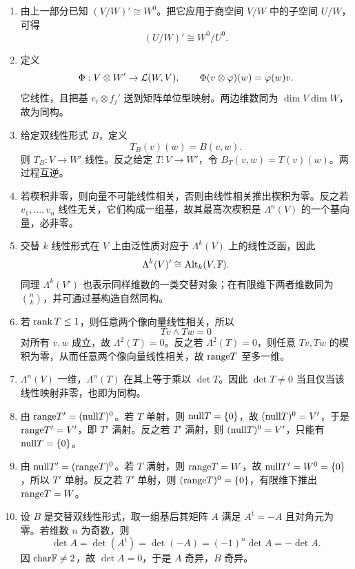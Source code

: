 \begin{enumerate}[resume, label=\textbf{\arabic*.}, leftmargin=*, itemsep=0.5em] \item 由上一部分已知 $(V/W)'\cong W^0$。把它应用于商空间 $V/W$ 中的子空间 $U/W$，可得 \[ (U/W)'\cong W^0/U^0. \] \item 定义 \[ \Phi:V\otimes W'\to \mathcal{L}(W,V),\qquad \Phi(v\otimes\varphi)(w)=\varphi(w)v. \] 它线性，且把基 $e_i\otimes f_j'$ 送到矩阵单位型映射。两边维数同为 $\dim V\dim W$，故为同构。 \item 给定双线性形式 $B$，定义 \[ T_B(v)(w)=B(v,w). \] 则 $T_B:V\to W'$ 线性。反之给定 $T:V\to W'$，令 $B_T(v,w)=T(v)(w)$。两过程互逆。 \item 若楔积非零，则向量不可能线性相关，否则由线性相关推出楔积为零。反之若 $v_1,\dots,v_n$ 线性无关，它们构成一组基，故其最高次楔积是 $\Lambda^n(V)$ 的一个基向量，必非零。 \item 交替 $k$ 线性形式在 $V$ 上由泛性质对应于 $\Lambda^k(V)$ 上的线性泛函，因此 \[ \Lambda^k(V)' \cong \mathrm{Alt}_k(V,\mathbb{F}). \] 同理 $\Lambda^k(V')$ 也表示同样维数的一类交替对象；在有限维下两者维数同为 $\binom{n}{k}$，并可通过基构造自然同构。 \item 若 $\operatorname{rank} T\leq 1$，则任意两个像向量线性相关，所以 \[ Tv\wedge Tw=0 \] 对所有 $v,w$ 成立，故 $\Lambda^2(T)=0$。反之若 $\Lambda^2(T)=0$，则任意 $Tv,Tw$ 的楔积为零，从而任意两个像向量线性相关，故 $\mathrm{range} T$ 至多一维。 \item $\Lambda^n(V)$ 一维，$\Lambda^n(T)$ 在其上等于乘以 $\det T$。因此 $\det T\neq 0$ 当且仅当该线性映射非零，也即为同构。 \item 由 $\mathrm{range} T'=(\mathrm{null} T)^0$。若 $T$ 单射，则 $\mathrm{null} T=\{0\}$，故 $(\mathrm{null} T)^0=V'$，于是 $\mathrm{range} T'=V'$，即 $T'$ 满射。反之若 $T'$ 满射，则 $(\mathrm{null} T)^0=V'$，只能有 $\mathrm{null} T=\{0\}$。 \item 由 $\mathrm{null} T'=(\mathrm{range} T)^0$。若 $T$ 满射，则 $\mathrm{range} T=W$，故 $\mathrm{null} T'=W^0=\{0\}$，所以 $T'$ 单射。反之若 $T'$ 单射，则 $(\mathrm{range} T)^0=\{0\}$，有限维下推出 $\mathrm{range} T=W$。 \item 设 $B$ 是交替双线性形式，取一组基后其矩阵 $A$ 满足 $A^{\mathrm t}=-A$ 且对角元为零。若维数 $n$ 为奇数，则 \[ \det A=\det(A^{\mathrm t})=\det(-A)=(-1)^n\det A=-\det A. \] 因 $\mathrm{char}\mathbb{F}\neq 2$，故 $\det A=0$，于是 $A$ 奇异，$B$ 奇异。 \end{enumerate}







